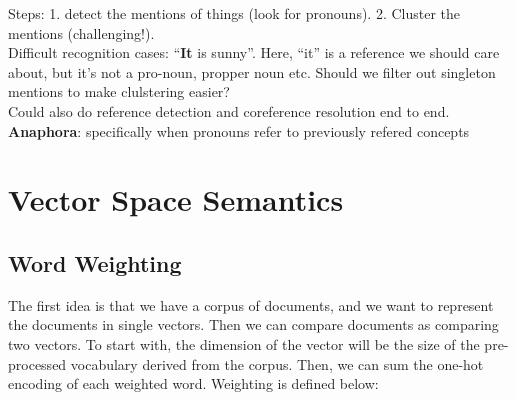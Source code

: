 \documentclass[]{article}
\begin{document}
	Steps: 1. detect the mentions of things (look for pronouns). 2. Cluster the mentions (challenging!). \\
	
	Difficult recognition cases: ``\textbf{It} is sunny''. Here, ``it'' is a reference we should care about, but it's not a pro-noun, propper noun etc. Should we filter out singleton mentions to make clulstering easier? \\
	
	Could also do reference detection and coreference resolution end to end.\\

	\textbf{Anaphora}: specifically when pronouns refer to previously refered concepts
	
	\clearpage
	\section{Vector Space Semantics}
    
    \subsection{Word Weighting}
    
    The first idea is that we have a corpus of documents, and we want to represent the documents in single vectors. Then we can compare documents as comparing two vectors. To start with, the dimension of the vector will be the size of the pre-processed vocabulary derived from the corpus. Then, we can sum the one-hot encoding of each weighted word. Weighting is defined below:
    
\end{document}
